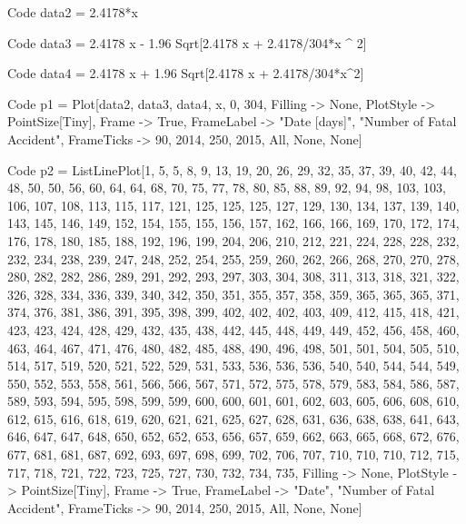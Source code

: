 \documentclass[a4paper,12pt]{article}
\begin{document}
\begin{mmaCell}[functionlocal=x]{Code}
  data2 = 2.4178*x
\end{mmaCell}
\begin{mmaCell}[functionlocal=x]{Code}
  data3 = 2.4178 x - 1.96 Sqrt[2.4178 x + 2.4178/304*x ^ 2]
\end{mmaCell}
\begin{mmaCell}[functionlocal=x]{Code}
  data4 = 2.4178 x + 1.96 Sqrt[2.4178 x + 2.4178/304*x^2]
\end{mmaCell}

\begin{mmaCell}[functionlocal=x]{Code}
  p1 = Plot[{data2, data3, data4}, {x, 0, 304}, Filling -> None, 
  PlotStyle -> PointSize[Tiny], Frame -> True, 
  FrameLabel -> {"Date [days]", "Number of Fatal Accident"}, 
  FrameTicks -> {{{90, 2014}, {250, 2015}}, All, None, None}]
\end{mmaCell}




\begin{mmaCell}[functionlocal=x]{Code}
  p2 = ListLinePlot[{1, 5, 5, 8, 9, 13, 19, 20, 26, 29, 
  32, 35, 37, 39, 40, 42, 44, 48, 50, 50, 56, 60, 64, 
  64, 68, 70, 75, 77, 78, 80, 85, 88, 89, 92, 94, 98, 
  103, 103, 106, 107, 108, 113, 115, 117, 121, 125, 
  125, 125, 127, 129, 130, 134, 137, 139, 140, 143, 
  145, 146, 149, 152, 154, 155, 155, 156, 157, 162, 
  166, 166, 169, 170, 172, 174, 176, 178, 180, 185, 
  188, 192, 196, 199, 204, 206, 210, 212, 221, 224, 
  228, 228, 232, 232, 234, 238, 239, 247, 248, 252, 
  254, 255, 259, 260, 262, 266, 268, 270, 270, 278, 
  280, 282, 282, 286, 289, 291, 292, 293, 297, 303, 
  304, 308, 311, 313, 318, 321, 322, 326, 328, 334, 
  336, 339, 340, 342, 350, 351, 355, 357, 358, 359, 
  365, 365, 365, 371, 374, 376, 381, 386, 391, 395, 
  398, 399, 402, 402, 402, 403, 409, 412, 415, 418, 
  421, 423, 423, 424, 428, 429, 432, 435, 438, 442, 
  445, 448, 449, 449, 452, 456, 458, 460, 463, 464, 
  467, 471, 476, 480, 482, 485, 488, 490, 496, 498, 
  501, 501, 504, 505, 510, 514, 517, 519, 520, 521, 
  522, 529, 531, 533, 536, 536, 536, 540, 540, 544, 
  544, 549, 550, 552, 553, 558, 561, 566, 566, 567, 
  571, 572, 575, 578, 579, 583, 584, 586, 587, 589, 
  593, 594, 595, 598, 599, 599, 600, 600, 601, 601, 
  602, 603, 605, 606, 608, 610, 612, 615, 616, 618, 
  619, 620, 621, 621, 625, 627, 628, 631, 636, 638, 
  638, 641, 643, 646, 647, 647, 648, 650, 652, 652, 
  653, 656, 657, 659, 662, 663, 665, 668, 672, 676, 
  677, 681, 681, 687, 692, 693, 697, 698, 699, 702, 
  706, 707, 710, 710, 710, 712, 715, 717, 718, 721, 
  722, 723, 725, 727, 730, 732, 734, 735},
   Filling -> None, PlotStyle -> PointSize[Tiny], Frame -> True, 
   FrameLabel -> {"Date", "Number of Fatal Accident"}, 
   FrameTicks -> {{{90, 2014}, {250, 2015}}, All, None, None}]
\end{mmaCell}
\end{document}
